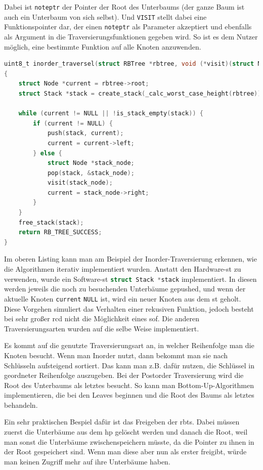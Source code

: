 \documentclass[11pt]{article}
\newcommand{\lstin}[1]{\lstinline[language=C]{#1}}
\begin{document}
Dabei ist \lstin{noteptr} der Pointer der Root des Unterbaums (der ganze Baum ist auch ein Unterbaum von sich selbst). Und \lstin{VISIT} stellt dabei eine Funktionspointer dar, der einen \lstin{noteptr} als Parameter akzeptiert und ebenfalls als Argument in die Traversierungsfunktionen gegeben wird.
So ist es dem Nutzer möglich, eine bestimmte Funktion auf alle Knoten anzuwenden.

\begin{lstlisting}[language=C]
uint8_t inorder_traversel(struct RBTree *rbtree, void (*visit)(struct Node*))
{
    struct Node *current = rbtree->root;
    struct Stack *stack = create_stack(_calc_worst_case_height(rbtree));

    while (current != NULL || !is_stack_empty(stack)) {
        if (current != NULL) {
            push(stack, current);
            current = current->left;
        } else {
            struct Node *stack_node;
            pop(stack, &stack_node);
            visit(stack_node);
            current = stack_node->right;
        }
    }
    free_stack(stack);
    return RB_TREE_SUCCESS;
}
\end{lstlisting}

Im oberen Listing kann man am Beispiel der Inorder-Traversierung erkennen, wie die Algorithmen iterativ implementiert wurden. Anstatt den Hardware-\gls{st} zu verwenden, wurde ein Software-\gls{st} \lstin{struct Stack *stack} implementiert.
In diesen werden jeweils die noch zu besuchenden Unterbäume gepushed, und wenn der aktuelle Knoten \lstin{current} \lstin{NULL} ist, wird ein neuer Knoten aus dem \gls{st} geholt.
Diese Vorgehen simuliert das Verhalten einer rekusiven Funktion, jedoch besteht bei sehr großer \gls{rcd} nicht die Möglichkeit eines \gls{sof}. Die anderen Traversierungsarten wurden auf die selbe Weise implementiert.

Es kommt auf die genutzte Traversierungsart an, in welcher Reihenfolge man die Knoten besucht. Wenn man Inorder nutzt, dann bekommt man sie nach Schlüsseln aufsteigend sortiert. Das kann man z.B. dafür nutzen, die Schlüssel in geordneter Reihenfolge auszugeben.
Bei der Postorder Traversierung wird die Root des Unterbaums als letztes besucht. So kann man Bottom-Up-Algorithmen implementieren, die bei den Leaves beginnen und die Root des Baums als letztes behandeln.

Ein sehr praktischen Bespiel dafür ist das Freigeben der \glspl{rbt}. Dabei müssen zuerst die Unterbäume aus dem \gls{hp} gelöscht werden und danach die Root, weil man sonst die Unterbäume zwischenspeichern müsste, da die Pointer zu ihnen in der Root gespeichert sind.
Wenn man diese aber nun als erster freigibt, würde man keinen Zugriff mehr auf ihre Unterbäume haben.
\end{document}
